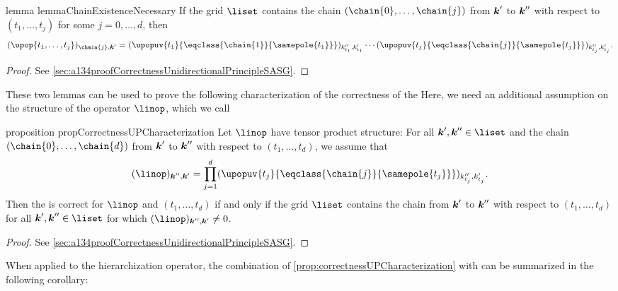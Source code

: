 \begin{restatable}{%
  lemma%
}{%
  lemmaChainExistenceNecessary%
}
  \label{lemma:chainExistenceNecessary}
  If the grid $\liset$ contains the chain $(\chain{0}, \dotsc, \chain{j})$
  from ${\boldsymbol{k}}'$ to ${\boldsymbol{k}}''$ with respect to $(t_1, \dotsc, t_j)$
  for some $j = 0, \dotsc, d$, then
  \begin{equation}
    \label{eq:lemmaChainExistenceNecessary}
    (\upop{t_1,\dotsc,t_j})_{\chain{j},\*k'}
    = (\upopuv{t_1}{\eqclass{\chain{1}}{\samepole{t_1}}})_{k''_{t_1},k'_{t_1}}
    \dotsm
    (\upopuv{t_j}{\eqclass{\chain{j}}{\samepole{t_j}}})_{k''_{t_j},k'_{t_j}}.
  \end{equation}
\end{restatable}

\begin{proof}
  See \cref{sec:a134proofCorrectnessUnidirectionalPrincipleSASG}.
\end{proof}

These two lemmas can be used to prove the following characterization
of the correctness of the \up{}
Here, we need an additional assumption on the structure of the
operator $\linop$, which we call 

\begin{restatable}{%
  proposition%
}{%
  propCorrectnessUPCharacterization%
}
  \label{prop:correctnessUPCharacterization}
  Let $\linop$ have tensor product structure:
  For all $\*k', \*k'' \in \liset$ and the chain
  $(\chain{0}, \dotsc, \chain{d})$ from ${\boldsymbol{k}}'$ to ${\boldsymbol{k}}''$
  with respect to $(t_1, \dotsc, t_d)$,
  we assume that
  \begin{equation}
    \label{eq:tensorProductOperator}
    (\linop)_{\*k'',\*k'}
    = \prod_{j=1}^d
    (\upopuv{t_j}{\eqclass{\chain{j}}{\samepole{t_j}}})_{k''_{t_j},k'_{t_j}}.
  \end{equation}
  Then the \up is correct for $\linop$ and $(t_1, \dotsc, t_d)$
  if and only if the grid $\liset$ contains the chain from ${\boldsymbol{k}}'$ to ${\boldsymbol{k}}''$
  with respect to $(t_1, \dotsc, t_d)$ for all $\*k', \*k'' \in \liset$
  for which $(\linop)_{\*k'',\*k'} \not= 0$.
\end{restatable}

\begin{proof}
  See \cref{sec:a134proofCorrectnessUnidirectionalPrincipleSASG}.
\end{proof}

When applied to the hierarchization operator,
the combination of \cref{prop:correctnessUPCharacterization} with
 can be summarized in
the following corollary:

